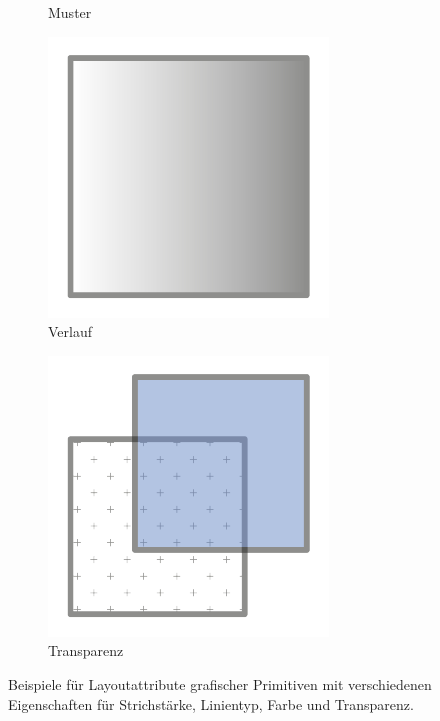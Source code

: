 \begin{figure}[h!tbp]
\begin{subfigure}{.25\textwidth}
  \caption*{Muster}
\end{subfigure}%
\begin{subfigure}{.25\textwidth}
  \centering
  \includegraphics[width=\linewidth]{bilder/vektor_pfadLayoutattributeG.pdf}
  \caption*{Verlauf}
\end{subfigure}%
\begin{subfigure}{.25\textwidth}
  \centering
  \includegraphics[width=\linewidth]{bilder/vektor_pfadLayoutattributeH.pdf}
  \caption*{Transparenz}
\end{subfigure}
\caption{Beispiele für Layoutattribute grafischer Primitiven mit verschiedenen Eigenschaften für Strichstärke, Linientyp, Farbe und Transparenz.}
\label{abb:vektor_pfadLayoutattribute}
\end{figure}

